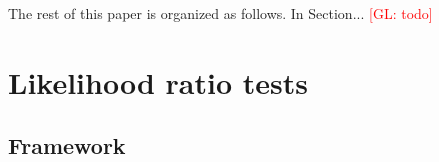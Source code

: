 \documentclass[12pt]{article}
\numberwithin{equation}{section}
\theoremstyle{plain}
\newcommand{\glnote}[1]{\textcolor{red}{[GL: #1]}}
\begin{document}
%

The rest of this paper is organized as follows. In Section... \glnote{todo}




\section{Likelihood ratio tests}
\label{sec:likelihood-ratio-tests}

\subsection{Framework}
\end{document}
